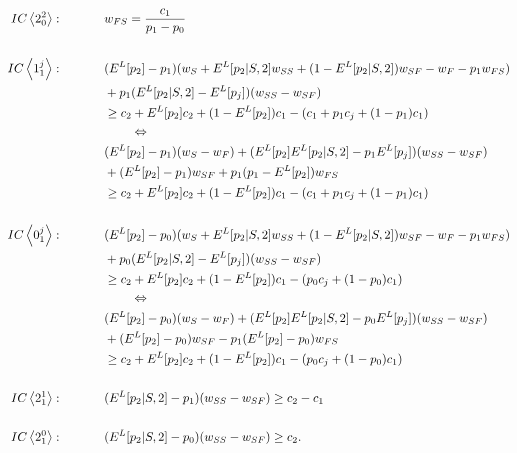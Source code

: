 \documentclass[11pt]{article} %
\theoremstyle{exampstyle}
\newcommand{\eq}[1]{\begin{align}#1\end{align}}
\newcommand{\la}{ \left < }
\newcommand{\ra}{ \right > }
\begin{document}
\eq{
IC\la2^2_0\ra: \hspace{.5in} &w_{FS}=\frac{c_1}{p_1-p_0} \notag 
\\
\notag 
\\
IC\la1^j_1\ra: \hspace{.5in} &(E^L[p_2] -p_1)(w_S+E^L[p_2|S,2]w_{SS}+(1-E^L[p_2|S,2])w_{SF}-w_F-p_1w_{FS}) \notag \\
&+p_1(E^L[p_2|S,2]-E^L[p_j])(w_{SS}-w_{SF})  \notag \\
& \ge c_2+E^L[p_2]c_2+(1-E^L[p_2])c_1-(c_1+p_1c_j+(1-p_1)c_1) \notag \\
& \hspace{.3in} \Leftrightarrow \notag \\
& (E^L[p_2]-p_1)(w_S-w_F) + (E^L[p_2] E^L[p_2 | S,2] - p_1 E^L[p_j] )( w_{SS} -w_{SF} ) \notag \\
& +(E^L[p_2]-p_1) w_{SF} + p_1 (p_1-E^L[p_2]) w_{FS} \notag \\
& \ge c_2 + E^L[p_2] c_2 + (1-E^L[p_2]) c_1 - (c_1 + p_1 c_j + (1-p_1) c_1 ) \notag 
\\
\notag 
\\
IC\la0^j_1\ra: \hspace{.5in} &(E^L[p_2] -p_0)(w_S+E^L[p_2|S,2]w_{SS}+(1-E^L[p_2|S,2])w_{SF} -w_F-p_1w_{FS}) \notag \\
&+p_0(E^L[p_2|S,2]-E^L[p_j])(w_{SS}-w_{SF})  \notag \\
& \ge c_2+E^L[p_2]c_2+(1-E^L[p_2])c_1-(p_0c_j+(1-p_0)c_1) \notag \\
& \hspace{.3in} \Leftrightarrow \notag \\
& (E^L[p_2]-p_0)(w_S-w_F) + (E^L[p_2] E^L[p_2 | S,2] - p_0 E^L[p_j] ) (w_{SS} -w_{SF}) \notag \\
& + (E^L[p_2] - p_0 ) w_{SF} - p_1 (E^L[p_2] - p_0) w_{FS} \notag \\
& \ge c_2 + E^L[p_2] c_2 + (1-E^L[p_2]) c_1 - ( p_0 c_j + (1-p_0) c_1 ) \notag 
\\
\notag 
\\
IC\la2^1_1\ra: \hspace{.5in} & (E^L[p_2|S,2]-p_1)(w_{SS}-w_{SF}) \ge c_2-c_1 \notag 
\\
\notag 
\\
IC\la2^0_1\ra: \hspace{.5in} & (E^L[p_2|S,2]-p_0)(w_{SS}-w_{SF}) \ge c_2. \notag 
}
\end{document}
